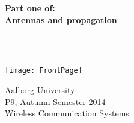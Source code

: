 \begin{center}
	\vspace*{1.5cm}
	
	\begin{Huge}
		\textbf{Part one of:\\
		Antennas and propagation}
	\end{Huge}\\~\\
	
	\vspace*{2cm}
	
	\texttt{[image: FrontPage]}
	\vspace*{2cm}
    
	Aalborg University\\
	P9, Autumn Semester 2014\\
	Wireless Communication Systems\\
\end{center}